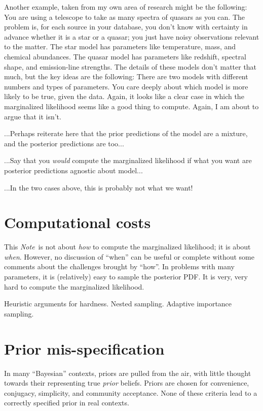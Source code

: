 \documentclass[12pt]{article}
\newcommand{\documentname}{\textsl{Note}}
\begin{document}
Another example, taken from my own area of research might be the following:
You are using a telescope to take as many spectra of quasars as you can.
The problem is, for each source in your database,
  you don't know with certainty in advance whether it is a star or a quasar;
  you just have noisy observations relevant to the matter.
The star model has parameters like temperature, mass, and chemical abundances.
The quasar model has parameters like redshift, spectral shape, and emission-line strengths.
The details of these models don't matter that much, but the key ideas are the following:
There are two models with different numbers and types of parameters.
You care deeply about which model is more likely to be true, given the data.
Again, it looks like a clear case in which the marginalized likelihood seems like a good thing to compute.
Again, I am about to argue that it isn't.

...Perhaps reiterate here that the prior predictions of the model are a mixture,
  and the posterior predictions are too...

...Say that you \emph{would} compute the marginalized likelihood if what you want
  are posterior predictions agnostic about model...

...In the two cases above, this is probably not what we want!

\section{Computational costs}

This \documentname\ is not about \emph{how} to compute the marginalized likelihood;
  it is about \emph{when}.
However, no discussion of ``when'' can be useful or complete without some comments
  about the challenges brought by ``how''.
In problems with many parameters, it is (relatively) easy to sample the posterior PDF.
It is very, very hard to compute the marginalized likelihood.

Heuristic arguments for hardness.
Nested sampling.
Adaptive importance sampling.

\section{Prior mis-specification}

In many ``Bayesian'' contexts, priors are pulled from the air,
  with little thought towards their representing true \emph{prior} beliefs.
Priors are chosen for convenience, conjugacy, simplicity, and community acceptance.
None of these criteria lead to a correctly specified prior in real contexts.
\end{document}
